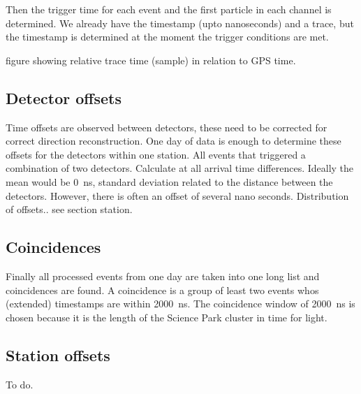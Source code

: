 Then the trigger time for each event and the first particle in each channel is determined. We already have the \gps timestamp (upto nanoseconds) and a trace, but the timestamp is determined at the moment the trigger conditions are met. 

figure showing  relative trace time (sample)  in relation to GPS time.


\subsection{Detector offsets}

Time offsets are observed between detectors, these need to be corrected for correct direction reconstruction. One day of data is enough to determine these offsets for the detectors within one station. All events that triggered a combination of two detectors. Calculate at all arrival time differences. Ideally the mean would be \SI{0}{\nano\second}, standard deviation related to the distance between the detectors. However, there is often an offset of several nano seconds. Distribution of offsets.. see section station. 


\subsection{Coincidences}

Finally all processed events from one day are taken into one long list and coincidences are found. A coincidence is a group of least two events whos (extended) timestamps are within \SI{2000}{\nano\second}. The coincidence window of \SI{2000}{\nano\second} is chosen because it is the length of the Science Park cluster in time for light. 


\subsection{Station offsets}

To do.
